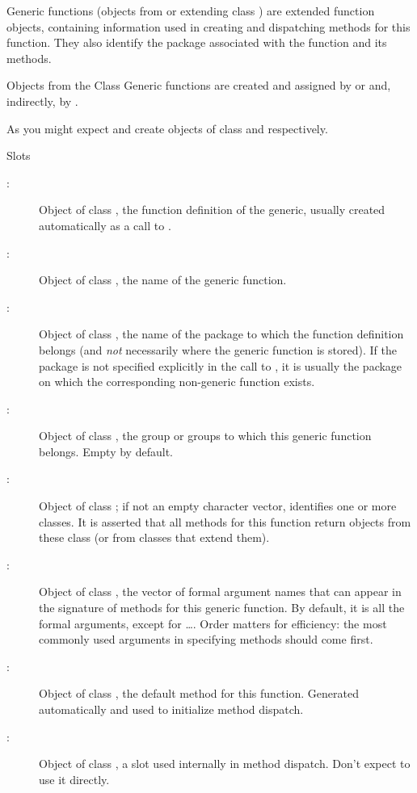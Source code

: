 %
\begin{Description}\relax
Generic functions (objects from or extending class
) are extended function objects,
containing information used in creating and dispatching methods for
this function.  They also identify the package associated with the
function and its methods.
\end{Description}
%
\begin{Section}{Objects from the Class}
Generic functions are created and assigned by
 or  and, indirectly, by
.

As you might expect  and
 create objects of class
 and  respectively.
\end{Section}
%
\begin{Section}{Slots}
\begin{description}

\item[:] Object of class , the
function definition of the generic, usually created
automatically as a call to . 
\item[:] Object of class , the
name of the generic function. 
\item[:] Object of class , the
name of the package to which the function definition belongs
(and \emph{not} necessarily where the generic function is
stored). If the package is not specified explicitly in the
call to , it is usually the package on which
the corresponding non-generic function exists. 
\item[:] Object of class , the group or
groups to which this generic function belongs.  Empty by default. 
\item[:] Object of class ; if
not an empty character vector, identifies one or more classes.  It is
asserted that all methods for this function return objects
from these class (or from classes that extend them). 
\item[:] Object of class , the
vector of formal argument names that can appear in the
signature of methods for this generic function.  By default,
it is all the formal arguments, except for \dots.  Order
matters for efficiency:  the most commonly used arguments in
specifying methods should come first. 
\item[:] Object of class ,
the default method for this function.  Generated
automatically and used to initialize method dispatch. 
\item[:] Object of class , a slot used
internally in method dispatch.  Don't expect to use it
directly.

\end{description}

\end{Section}
